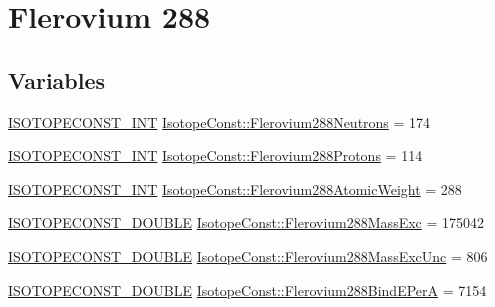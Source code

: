 \hypertarget{group___isotope_const-_flerovium-_fl288}{}\section{Flerovium 288}
\label{group___isotope_const-_flerovium-_fl288}
\subsection*{Variables}
\begin{DoxyCompactItemize}
\item 
\mbox{\hyperlink{group___isotope_const-_macros_ga5f18360b3e99483a35c32d789e62621c}{I\+S\+O\+T\+O\+P\+E\+C\+O\+N\+S\+T\+\_\+\+I\+NT}} \mbox{\hyperlink{group___isotope_const-_flerovium-_fl288_gaae7aa45a13ef2bf0c596d221e40370a9}{Isotope\+Const\+::\+Flerovium288\+Neutrons}} = 174
\item 
\mbox{\hyperlink{group___isotope_const-_macros_ga5f18360b3e99483a35c32d789e62621c}{I\+S\+O\+T\+O\+P\+E\+C\+O\+N\+S\+T\+\_\+\+I\+NT}} \mbox{\hyperlink{group___isotope_const-_flerovium-_fl288_ga2517ce87f5f3847c226aaee084af9ddc}{Isotope\+Const\+::\+Flerovium288\+Protons}} = 114
\item 
\mbox{\hyperlink{group___isotope_const-_macros_ga5f18360b3e99483a35c32d789e62621c}{I\+S\+O\+T\+O\+P\+E\+C\+O\+N\+S\+T\+\_\+\+I\+NT}} \mbox{\hyperlink{group___isotope_const-_flerovium-_fl288_ga4c4608a7279cf277d6902cf43d47ae52}{Isotope\+Const\+::\+Flerovium288\+Atomic\+Weight}} = 288
\item 
\mbox{\hyperlink{group___isotope_const-_macros_ga8f45a7272ce02c0b4c65c44636ed719a}{I\+S\+O\+T\+O\+P\+E\+C\+O\+N\+S\+T\+\_\+\+D\+O\+U\+B\+LE}} \mbox{\hyperlink{group___isotope_const-_flerovium-_fl288_ga52dcb17dad0d9e0fddcfcec3e5289304}{Isotope\+Const\+::\+Flerovium288\+Mass\+Exc}} = 175042
\item 
\mbox{\hyperlink{group___isotope_const-_macros_ga8f45a7272ce02c0b4c65c44636ed719a}{I\+S\+O\+T\+O\+P\+E\+C\+O\+N\+S\+T\+\_\+\+D\+O\+U\+B\+LE}} \mbox{\hyperlink{group___isotope_const-_flerovium-_fl288_gae0b4b315ac470ed46a1cf11a08ca2be7}{Isotope\+Const\+::\+Flerovium288\+Mass\+Exc\+Unc}} = 806
\item 
\mbox{\hyperlink{group___isotope_const-_macros_ga8f45a7272ce02c0b4c65c44636ed719a}{I\+S\+O\+T\+O\+P\+E\+C\+O\+N\+S\+T\+\_\+\+D\+O\+U\+B\+LE}} \mbox{\hyperlink{group___isotope_const-_flerovium-_fl288_ga27b60cec37f4c81534d96e74b6d0e237}{Isotope\+Const\+::\+Flerovium288\+Bind\+E\+PerA}} = 7154
\item 

\end{DoxyCompactItemize}
